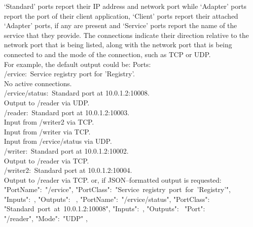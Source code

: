 `Standard' ports report their IP address and network port while `Adapter' ports report
the \mplusm{} port of their client application, `Client' ports report their attached
`Adapter' ports, if any are present and `Service' ports report the name of the \mplusm{}
service that they provide.
The connections indicate their direction relative to the \yarp{} network port that is
being listed, along with the \yarp{} network port that is being connected to and the mode
of the connection, such as TCP or UDP.\\

For example, the default output could be:
\outputBegin{}
Ports:\\
\settowidth{\utilLen}{Por}%
/\textdollar{}ervice:\ Service registry port for 'Registry'.\\
\hspace*{\utilLen}No active connections.\\
/\textdollar{}ervice/status:\ Standard port at 10.0.1.2:10008.\\
\hspace*{\utilLen}Output to /reader via UDP.\\
/reader:\ Standard port at 10.0.1.2:10003.\\
\hspace*{\utilLen}Input from /writer2 via TCP.\\
\hspace*{\utilLen}Input from /writer via TCP.\\
\hspace*{\utilLen}Input from /\textdollar{}ervice/status via UDP.\\
/writer:\ Standard port at 10.0.1.2:10002.\\
\hspace*{\utilLen}Output to /reader via TCP.\\
/writer2:\ Standard port at 10.0.1.2:10004.\\
\hspace*{\utilLen}Output to /reader via TCP.
\outputEnd{}
or, if JSON--formatted output is requested:
\outputBegin{}
\openSq{} \textbraceleft{} "PortName":\ "/\textdollar{}ervice",
"PortClass":\ "Service~registry~port~for~'Registry'", "Inputs":\ \sqPair, "Outputs":\
\sqPair{} \textbraceright{}, \textbraceleft{} "PortName":\ "/\textdollar{}ervice/status",
"PortClass":\ \\
"Standard~port~at~10.0.1.2:10008", "Inputs":\ \sqPair, "Outputs":\ \openSq{}
\textbraceleft{} "Port":\ \\
"/reader", "Mode":\ "UDP" \textbraceright{} \closeSq{} \textbraceright{},
